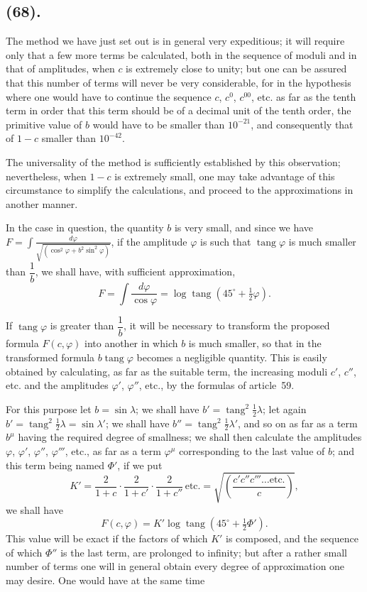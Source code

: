 \documentclass{article}
\begin{document}
\subsection*{(68).}

The method we have just set out is in general very expeditious; it will require only that a few more terms be calculated, both in the sequence of moduli and in that of amplitudes, when $c$ is extremely close to unity; but one can be assured that this number of terms will never be very considerable, for in the hypothesis where one would have to continue the sequence $c$, $c^{0}$, $c^{00}$, etc. as far as the tenth term in order that this term should be of a decimal unit of the tenth order, the primitive value of $b$ would have to be smaller than $10^{-21}$, and consequently that of $1-c$ smaller than $10^{-42}$.

The universality of the method is sufficiently established by this observation; nevertheless, when $1-c$ is extremely small, one may take advantage of this circumstance to simplify the calculations, and proceed to the approximations in another manner.

In the case in question, the quantity $b$ is very small, and since we have $F=\displaystyle\int\frac{d\varphi}{\sqrt{(\cos^{2}\varphi+b^{2}\sin^{2}\varphi)}}$, if the amplitude $\varphi$ is such that $\operatorname{tang}\varphi$ is much smaller than $\dfrac{1}{b}$, we shall have, with sufficient approximation,
\[ F=\int\frac{d\varphi}{\cos\varphi}=\log\operatorname{tang}(45^{\circ}+\tfrac{1}{2}\varphi). \]

If $\operatorname{tang}\varphi$ is greater than $\dfrac{1}{b}$, it will be necessary to transform the proposed formula $F(c,\varphi)$ into another in which $b$ is much smaller, so that in the transformed formula $b\operatorname{tang}\varphi$ becomes a negligible quantity. This is easily obtained by calculating, as far as the suitable term, the increasing moduli $c'$, $c''$, etc. and the amplitudes $\varphi'$, $\varphi''$, etc., by the formulas of article~59.

For this purpose let $b=\sin\lambda$; we shall have $b'=\operatorname{tang}^{2}\frac{1}{2}\lambda$; let again $b'=\operatorname{tang}^{2}\frac{1}{2}\lambda=\sin\lambda'$; we shall have $b''=\operatorname{tang}^{2}\frac{1}{2}\lambda'$, and so on as far as a term $b^{\mu}$ having the required degree of smallness; we shall then calculate the amplitudes $\varphi$, $\varphi'$, $\varphi''$, $\varphi'''$, etc., as far as a term $\varphi^{\mu}$ corresponding to the last value of $b$; and this term being named $\Phi'$, if we put
\[ K'=\frac{2}{1+c}\cdot\frac{2}{1+c'}\cdot\frac{2}{1+c''}\,\text{etc.}=\sqrt{\left(\frac{c'c''c'''\ldots\text{etc.}}{c}\right)}, \]
we shall have
\[ F(c,\varphi)=K'\log\operatorname{tang}(45^{\circ}+\tfrac{1}{2}\Phi'). \]
This value will be exact if the factors of which $K'$ is composed, and the sequence of which $\Phi''$ is the last term, are prolonged to infinity; but after a rather small number of terms one will in general obtain every degree of approximation one may desire. One would have at the same time
\end{document}

